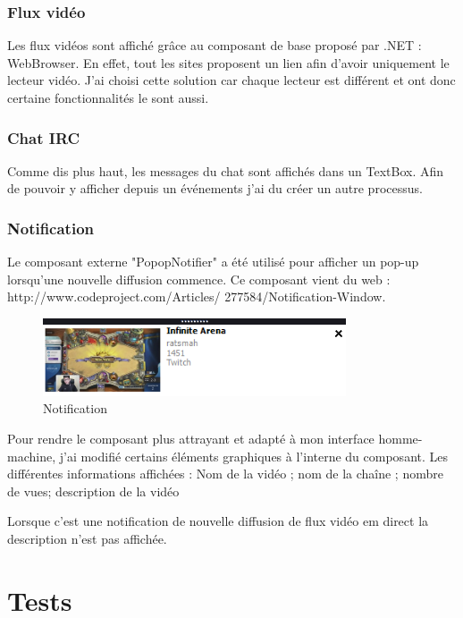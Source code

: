 \documentclass[11pt]{report} %
\begin{document}
		\subsection{Flux vidéo}
		Les flux vidéos sont affiché grâce au composant de base proposé par .NET : WebBrowser. En effet, tout les sites proposent un lien afin d'avoir uniquement le lecteur vidéo.
		J'ai choisi cette solution car chaque lecteur est différent et ont donc certaine fonctionnalités le sont aussi.
		
		\subsection{Chat IRC}
		Comme dis plus haut, les messages du chat sont affichés dans un TextBox. Afin de pouvoir y afficher depuis un événements j'ai du créer un autre processus.
		
		
		\subsection{Notification}
		Le composant externe "PopopNotifier" a été utilisé pour afficher un pop-up lorsqu’une nouvelle
		diffusion commence. Ce composant vient du web : http://www.codeproject.com/Articles/
		277584/Notification-Window.
		
		\begin{figure}[h]
			\center
			\includegraphics[width=0.8\textwidth]{../img/notificationview.png}
			\caption{Notification}
			\label{vue notification}
		\end{figure}
		
		Pour rendre le composant plus attrayant et adapté à mon interface homme-machine, j’ai modifié
		certains éléments graphiques à l'interne du composant.
		Les différentes informations affichées : Nom de la vidéo ; nom de la chaîne ; nombre de vues; description de la vidéo
		
		Lorsque c'est une notification de nouvelle diffusion de flux vidéo em direct la description n'est pas affichée.
		
	
\chapter{Tests}
\end{document}
